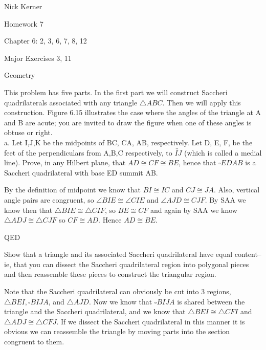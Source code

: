\documentclass[12pt,letterpaper]{article}
\newcommand{\Proof}{\noindent {\bf Proof: }}
\newcommand{\QED}{\begin{flushright}QED\end{flushright}}
\newcommand{\pro}[1]{\noindent {\bf #1}}
\begin{document}
\begin{flushright}
Nick Kerner

Homework 7

Chapter 6: 2, 3, 6, 7, 8, 12

Major Exercises 3, 11

\end{flushright}
\begin{center}
\large{Geometry}\\
\end{center}

\pro{2 }This problem has five parts.  In the first part we will construct Saccheri quadrilaterals associated with any triangle $\triangle ABC$.  Then we will apply this construction.  Figure 6.15 illustrates the case where the angles of the triangle at A and B are acute;  you are invited to draw the figure when one of these angles is obtuse or right.  \\


a. Let I,J,K be the midpoints of BC, CA, AB, respectively.  Let D, E, F, be the feet of the perpendiculars from A,B,C respectively, to $\overleftrightarrow{IJ}$ (which is called a medial line).  Prove, in any Hilbert plane, that $AD \cong CF \cong BE$, hence that $\square EDAB$ is a Saccheri quadrilateral with base ED summit AB.  \\

\Proof

By the definition of midpoint we know that $BI \cong IC$ and $CJ \cong JA$.  Also, vertical angle pairs are congruent, so $\angle BIE \cong \angle CIE$ and $\angle AJD \cong CJF$.  By SAA we know then that $\triangle BIE \cong \triangle CIF$, so $BE \cong CF$ and again by SAA we know $\triangle ADJ \cong \triangle CJF$ so $CF \cong AD$.  Hence $AD \cong BE$. 


\QED



Show that a triangle and its associated Saccheri quadrilateral have equal content-- ie, that you can dissect the Saccheri quadrilateral region into polygonal pieces and then reassemble these pieces to construct the triangular region. \\

\Proof

Note that the Saccheri quadrilateral can obviously be cut into 3 regions, $\triangle BEI, \square BIJA$, and $\triangle AJD$.  Now we know that $\square BIJA$ is shared between the triangle and the Saccheri quadrilateral, and we know that $\triangle BEI \cong \triangle CFI$ and $\triangle ADJ \cong \triangle CFJ$.  If we dissect the Saccheri quadrilateral in this manner it is obvious we can reassemble the triangle by moving  parts into the section congruent to them. 
\end{document}
